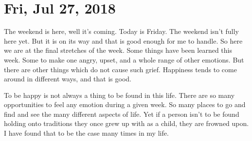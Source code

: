 \section{Fri, Jul 27, 2018}

The weekend is here, well it's coming. Today is Friday. The weekend isn't fully here
yet. But it is on its way and that is good enough for me to handle. So here we are at
the final stretches of the week. Some things have been learned this week. Some to
make one angry, upset, and a whole range of other emotions. But there are other
things which do not cause such grief. Happiness tends to come around in different
ways, and that is good.

To be happy is not always a thing to be found in this life. There are so many
opportunities to feel any emotion during a given week. So many places to go and find
and see the many different aspects of life. Yet if a person isn't to be found holding
onto traditions they once grew up with as a child, they are frowned upon. I have
found that to be the case many times in my life.